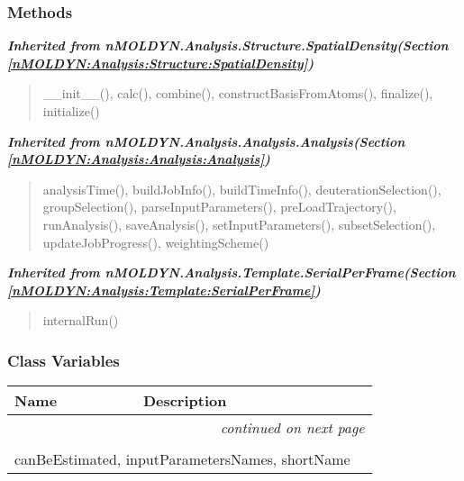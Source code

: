 
  \subsubsection{Methods}


\large{\textbf{\textit{Inherited from nMOLDYN.Analysis.Structure.SpatialDensity\textit{(Section \ref{nMOLDYN:Analysis:Structure:SpatialDensity})}}}}

\begin{quote}
\_\_init\_\_(), calc(), combine(), constructBasisFromAtoms(), finalize(), initialize()
\end{quote}

\large{\textbf{\textit{Inherited from nMOLDYN.Analysis.Analysis.Analysis\textit{(Section \ref{nMOLDYN:Analysis:Analysis:Analysis})}}}}

\begin{quote}
analysisTime(), buildJobInfo(), buildTimeInfo(), deuterationSelection(), groupSelection(), parseInputParameters(), preLoadTrajectory(), runAnalysis(), saveAnalysis(), setInputParameters(), subsetSelection(), updateJobProgress(), weightingScheme()
\end{quote}

\large{\textbf{\textit{Inherited from nMOLDYN.Analysis.Template.SerialPerFrame\textit{(Section \ref{nMOLDYN:Analysis:Template:SerialPerFrame})}}}}

\begin{quote}
internalRun()
\end{quote}


  \subsubsection{Class Variables}

    \vspace{-1cm}
\hspace{\varindent}\begin{longtable}{|p{\varnamewidth}|p{\vardescrwidth}|l}
\cline{1-2}
\cline{1-2} \centering \textbf{Name} & \centering \textbf{Description}& \\
\cline{1-2}
\endhead\cline{1-2}\multicolumn{3}{r}{\small\textit{continued on next page}}\\\endfoot\cline{1-2}
\endlastfoot\multicolumn{2}{|l|}{\textit{Inherited from nMOLDYN.Analysis.Structure.SpatialDensity \textit{(Section \ref{nMOLDYN:Analysis:Structure:SpatialDensity})}}}\\
\multicolumn{2}{|p{\varwidth}|}{\raggedright canBeEstimated, inputParametersNames, shortName}\\
\cline{1-2}
\end{longtable}

